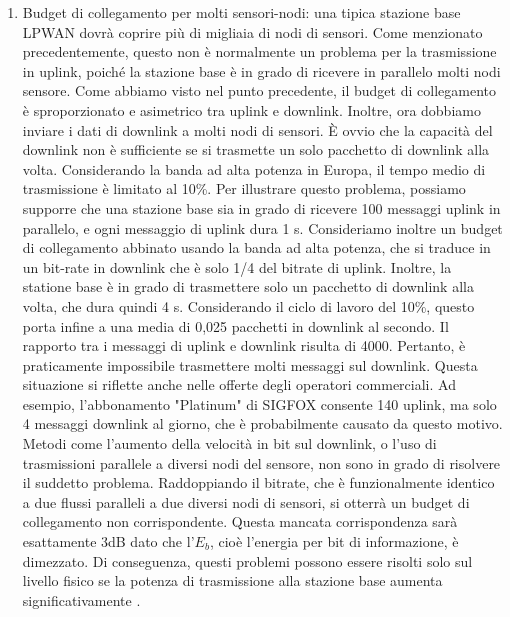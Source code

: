 \documentclass[a4paper]{report} %
\begin{document}
\begin{enumerate}
\item Budget di collegamento per molti sensori-nodi: una tipica stazione base LPWAN dovrà coprire più di migliaia di nodi di sensori. Come menzionato precedentemente, questo non è normalmente un problema per la trasmissione in uplink, poiché la stazione base è in grado di ricevere in parallelo molti nodi sensore. Come abbiamo visto nel punto precedente, il budget di collegamento è sproporzionato e asimetrico tra uplink e downlink. Inoltre, ora dobbiamo inviare i dati di downlink a molti nodi di sensori. È ovvio che la capacità del downlink non è sufficiente se si trasmette un solo pacchetto di downlink alla volta. Considerando la banda ad alta potenza in Europa, il tempo medio di trasmissione è limitato al 10\%. Per illustrare questo problema, possiamo supporre che una stazione base sia in grado di ricevere 100 messaggi uplink in parallelo, e ogni messaggio di uplink dura 1 s. Consideriamo inoltre un budget di collegamento abbinato usando la banda ad alta potenza, che si traduce in un bit-rate in downlink che è solo 1/4 del bitrate di uplink. Inoltre, la statione base è in grado di trasmettere solo un pacchetto di downlink alla volta, che dura quindi 4 s. Considerando il ciclo di lavoro del 10\%, questo porta infine a una media di 0,025 pacchetti in downlink al secondo. Il rapporto tra i messaggi di uplink e downlink risulta di 4000. Pertanto, è praticamente impossibile trasmettere molti messaggi sul downlink. Questa situazione si riflette anche nelle offerte degli operatori commerciali. Ad esempio, l'abbonamento "Platinum" di SIGFOX consente 140 uplink, ma solo 4 messaggi downlink al giorno, che è probabilmente causato da questo motivo. Metodi come l'aumento della velocità in bit sul downlink, o l'uso di trasmissioni parallele a diversi nodi del sensore, non sono in grado di risolvere il suddetto problema. Raddoppiando il bitrate, che è funzionalmente identico a due flussi paralleli a due diversi nodi di sensori, si otterrà un budget di collegamento non corrispondente. Questa mancata corrispondenza sarà esattamente 3dB dato che l'$E_{b}$, cioè l'energia per bit di informazione, è dimezzato. Di conseguenza, questi problemi possono essere risolti solo sul livello fisico se la potenza di trasmissione alla stazione base aumenta significativamente \cite{art:rif.40}.
\end{enumerate}
\end{document}
